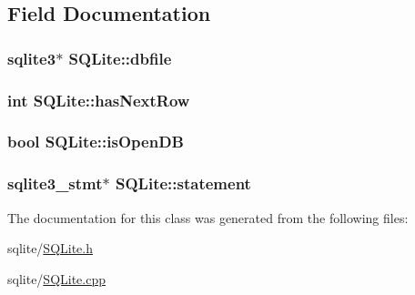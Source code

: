 \subsection{\-Field \-Documentation}
\hypertarget{classSQLite_a206e8b4696cbea9d8091310cf17213ee}{
\subsubsection[{dbfile}]{\setlength{\rightskip}{0pt plus 5cm}sqlite3$\ast$ {\bf \-S\-Q\-Lite\-::dbfile}}}\label{classSQLite_a206e8b4696cbea9d8091310cf17213ee}
\hypertarget{classSQLite_add18111d5de9e218a147dbceb0aa7899}{
\subsubsection[{has\-Next\-Row}]{\setlength{\rightskip}{0pt plus 5cm}int {\bf \-S\-Q\-Lite\-::has\-Next\-Row}}}\label{classSQLite_add18111d5de9e218a147dbceb0aa7899}
\hypertarget{classSQLite_a7d855ec7c6e9644201b59321375a6fa5}{
\subsubsection[{is\-Open\-D\-B}]{\setlength{\rightskip}{0pt plus 5cm}bool {\bf \-S\-Q\-Lite\-::is\-Open\-D\-B}}}\label{classSQLite_a7d855ec7c6e9644201b59321375a6fa5}
\hypertarget{classSQLite_ac9fcbb5e55073780e5b7a6b10147d74e}{
\subsubsection[{statement}]{\setlength{\rightskip}{0pt plus 5cm}sqlite3\-\_\-stmt$\ast$ {\bf \-S\-Q\-Lite\-::statement}}}\label{classSQLite_ac9fcbb5e55073780e5b7a6b10147d74e}


\-The documentation for this class was generated from the following files\-:\begin{DoxyCompactItemize}
\item 
sqlite/\hyperlink{SQLite_8h}{\-S\-Q\-Lite.\-h}\item 
sqlite/\hyperlink{SQLite_8cpp}{\-S\-Q\-Lite.\-cpp}\end{DoxyCompactItemize}
